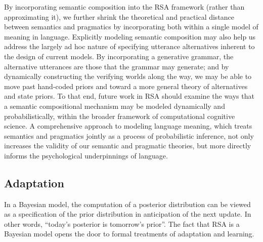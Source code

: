 \documentclass{sp}
\begin{document}
By incorporating semantic composition into the RSA framework (rather than approximating it), we further shrink the theoretical and practical distance between semantics and pragmatics by incorporating both within a single model of meaning in language.
Explicitly modeling semantic composition may also help us address the largely ad hoc nature of specifying utterance alternatives inherent to the design of current models. By incorporating a generative grammar, the alternative utterances are those that the grammar may generate; and by dynamically constructing the verifying worlds along the way, we may be able to move past hand-coded priors and toward a more general theory of alternatives and state priors. 
To that end, future work in RSA should examine the ways that a semantic compositional mechanism may be modeled dynamically and probabilistically, within the broader framework of computational cognitive science. A comprehensive approach to modeling language meaning, which treats semantics and pragmatics jointly as a process of probabilistic inference, not only increases the validity of our semantic and pragmatic theories, but more directly informs the psychological underpinnings of language.

\subsection{Adaptation}

In a Bayesian model, the computation of a posterior distribution can be viewed as a specification of the prior distribution in anticipation of the next update.
In other words, ``today's posterior is tomorrow's prior''.
The fact that RSA is a Bayesian model opens the door to formal treatments of adaptation and learning. 
\end{document}

